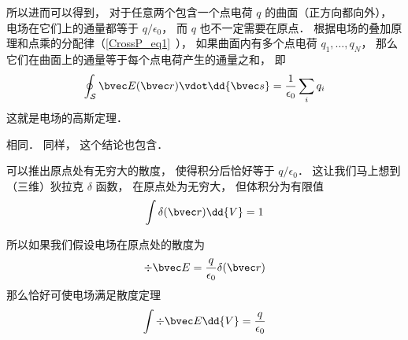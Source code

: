 所以进而可以得到， 对于任意两个包含一个点电荷 $q$ 的曲面（正方向都向外）， 电场在它们上的通量都等于 $q/\epsilon_0$， 而 $q$ 也不一定需要在原点． 根据电场的叠加原理和点乘的分配律（\autoref{CrossP_eq1}~）， 如果曲面内有多个点电荷 $q_1, \dots, q_N$， 那么它们在曲面上的通量等于每个点电荷产生的通量之和， 即
\begin{equation}
\oint_{\mathcal S} \bvec E(\bvec r) \vdot \dd{\bvec s} = \frac{1}{\epsilon_0} \sum_i q_i
\end{equation}
这就是电场的高斯定理．


相同． 同样， 这个结论也包含．

可以推出原点处有无穷大的散度， 使得积分后恰好等于 $q/\epsilon_0$． 这让我们马上想到（三维）狄拉克 $\delta$ 函数， 在原点处为无穷大， 但体积分为有限值
\begin{equation}
\int \delta(\bvec r)\dd{V} = 1
\end{equation}

所以如果我们假设电场在原点处的散度为
\begin{equation}
\div \bvec E = \frac{q}{\epsilon_0}\delta(\bvec r)
\end{equation}
那么恰好可使电场满足散度定理
\begin{equation}
\int \div \bvec E \dd{V} = \frac{q}{\epsilon_0}
\end{equation}
